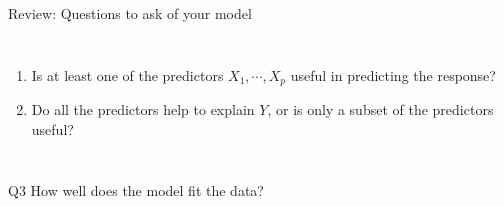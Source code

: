 \documentclass[aspectratio=169,usenames,dvipsnames]{beamer}
\newcommand{\InstructorList}[1]{
\begin{itemize}
	\color{orange}
	#1
\end{itemize}
}
\renewcommand{\InstructorList}[1]{}
\begin{document}
\begin{frame}[c]{Review: Questions to ask of your model }

	\begin{columns}
	\centering
	\begin{enumerate}
		\item Is at least one of the predictors $X_1, \cdots, X_p$ useful in predicting the response?
	\item Do all the predictors help to explain $Y$, or is only a subset of the predictors useful?
	
	\end{enumerate}
	\centering
	\InstructorList{
	\item Hypothesis test, F-statistic, at least one $\beta_j$ is non-zero
	\item Forward and Backward selection
	\item RSE, $R^2$, eyeball test
	\item Confidence intervals and prediction intervals
	
	}
	\end{columns}
	
	\end{frame}

\begin{frame}

	\begin{columns}
	\column{.5\textwidth}
	\centering
	\begin{block}
		{Q3}
	How well does the model fit the data?
	\end{block}
	
	\end{columns}
	
	\end{frame}
	
\end{document}
